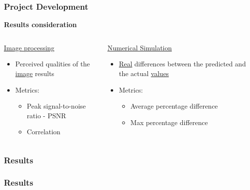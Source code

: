 \documentclass[18pt]{beamer}
\begin{document}
\begin{frame}[t]
  \frametitle{Project Development}
  \large{\textbf{Results consideration}}
  \vspace{-0.5cm}
  \begin{columns}[t]
    \begin{column}{0.5\textwidth}
      \begin{center}
        {\large \underline{Image processing}}
        \begin{itemize}
        \item Perceived qualities of the \underline{image} results
        \item Metrics:
          \begin{itemize}
          \item Peak signal-to-noise ratio - PSNR
          \item Correlation
          \end{itemize}
        \end{itemize}
      \end{center}
    \end{column}
    \begin{column}{0.5\textwidth}
      \begin{center}
        {\large \underline{Numerical Simulation}}
        \begin{itemize}
        \item \underline{Real} differences between the predicted and the actual \underline{values}
        \item Metrics:
          \begin{itemize}
            \item Average percentage difference
            \item Max percentage difference
          \end{itemize}
        \end{itemize}
      \end{center}  
    \end{column}
  \end{columns}
\end{frame}


\begin{frame}[t]
  \frametitle{Results}
\end{frame}

\begin{frame}[t]
  \frametitle{Results}
\end{frame}
\end{document}
